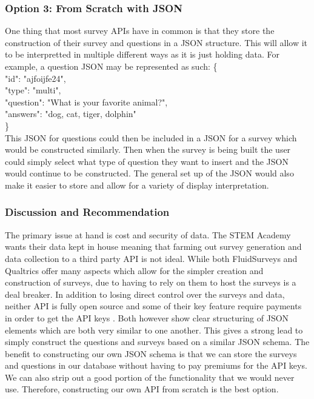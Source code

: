 \documentclass[letterpaper,10pt,serif, draftclsnofoot,onecolumn, compsoc, titlepage]{IEEEtran}
\begin{document}
\subsubsection{Option 3: From Scratch with JSON}
One thing that most survey APIs have in common is that they store the construction of their survey and questions in a JSON structure. This will allow it to be interpretted in multiple different ways as it is just holding data. For example, a question JSON may be represented as such:
\newline
\{\\
\indent "id": "ajfoijfe24",\\
\indent "type": "multi",\\
\indent "question": "What is your favorite animal?",\\
\indent "answers": "dog, cat, tiger, dolphin"\\
\}\\
This JSON for questions could then be included in a JSON for a survey which would be constructed similarly. Then when the 
survey is being built the user could simply select what type of question they want to insert and the JSON would continue to be constructed. The general set up of the JSON would also make it easier to store and allow for a variety of display interpretation. 
\subsubsection{Discussion and Recommendation}
The primary issue at hand is cost and security of data. The STEM Academy wants their data kept in house meaning that farming out
 survey generation and data collection to a third party API is not ideal. While both FluidSurveys and Qualtrics offer many
 aspects which allow for the simpler creation and construction of surveys, due to having to rely on them to host the surveys is a 
deal breaker. In addition to losing direct control over the surveys and data, neither API is fully open source and some of their key feature require payments in order to get the API keys \cite{qualtricsAPI} \cite{surveyMonkeyCost}. Both however show clear structuring of JSON elements which are both
very similar to one another. This gives a strong lead to simply construct the questions and surveys based on a similar JSON
schema. The benefit to constructing our own JSON schema is that we can store the surveys and questions in our database
without having to pay premiums for the API keys. We can also strip out a good portion of the functionality that we would never
use. Therefore, constructing our own API from scratch is the best option. 
\end{document}
